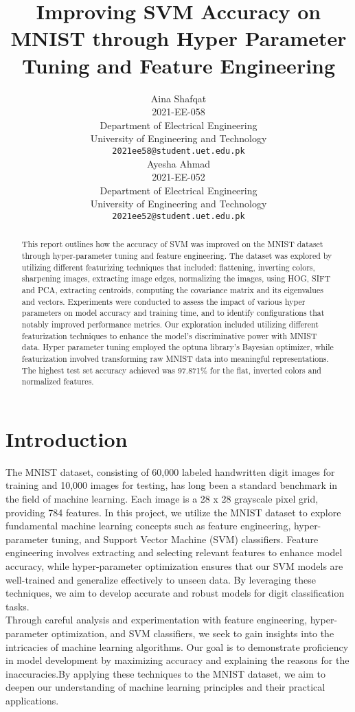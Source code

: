 \documentclass{article}
\title{Improving SVM Accuracy on MNIST through Hyper Parameter Tuning and Feature Engineering}
\author{
  Aina Shafqat \\
  2021-EE-058 \\
  Department of Electrical Engineering \\
  University of Engineering and Technology \\
  \texttt{2021ee58@student.uet.edu.pk} \\
  \And
  Ayesha Ahmad \\
  2021-EE-052 \\
  Department of Electrical Engineering \\
  University of Engineering and Technology \\
  \texttt{2021ee52@student.uet.edu.pk} \\
}
\begin{document}
\maketitle

\begin{abstract}
This report outlines how the accuracy of SVM was improved on the MNIST dataset through hyper-parameter tuning and feature engineering. The dataset was explored by utilizing different featurizing techniques that included: flattening, inverting colors, sharpening images, extracting image edges, normalizing the images, using HOG, SIFT and PCA, extracting centroids, computing the covariance matrix and its eigenvalues and vectors. Experiments were conducted to assess the impact of various hyper parameters on model accuracy and training time, and to identify configurations that notably improved performance metrics. Our exploration included utilizing different featurization techniques to enhance the model's discriminative power with MNIST data. Hyper parameter tuning employed the optuna library's Bayesian optimizer, while featurization involved transforming raw MNIST data into meaningful representations. The highest test set accuracy achieved was 97.871\% for the flat, inverted colors and normalized features.

\end{abstract}

\section{Introduction} 
The MNIST dataset, consisting of 60,000 labeled handwritten digit images for training and 10,000 images for testing, has long been a standard benchmark in the field of machine learning. Each image is a 28 x 28 grayscale pixel grid, providing 784 features. In this project, we utilize the MNIST dataset to explore fundamental machine learning concepts such as feature engineering, hyper-parameter tuning, and Support Vector Machine (SVM) classifiers. Feature engineering involves extracting and selecting relevant features to enhance model accuracy, while hyper-parameter optimization ensures that our SVM models are well-trained and generalize effectively to unseen data. By leveraging these techniques, we aim to develop accurate and robust models for digit classification tasks.
\\
Through careful analysis and experimentation with feature engineering, hyper-parameter optimization, and SVM classifiers, we seek to gain insights into the intricacies of machine learning algorithms.  Our goal is to demonstrate proficiency in model development by maximizing accuracy and explaining the reasons for the inaccuracies.By applying these techniques to the MNIST dataset, we aim to deepen our understanding of machine learning principles and their practical applications.
\end{document}
